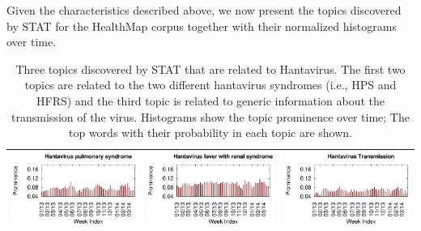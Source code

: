 \documentclass[conference]{IEEEtran}
\newcommand{\model}{{STAT}\xspace} %
\begin{document}
Given the characteristics described above, we now present the topics discovered by \model for the HealthMap corpus together with their normalized histograms over time.


\begin{table}[t]
\begin{center}
\caption{Three topics discovered by \model that are related to Hantavirus. The first two topics are related to the two different hantavirus syndromes (i.e., HPS and HFRS) and the third topic is related to generic information about the  transmission of the virus. Histograms show the topic prominence over time; The top words with their probability in each topic are shown.}
\large{
\begin{tabular}{|lr|lr|lr|}
\hline
\multicolumn{2}{|c|}{\includegraphics[clip,scale=0.45]{fig/topic_hanta_timeline.eps}} & \multicolumn{2}{|c|}{\includegraphics[clip,scale=0.45]{fig/topic_hanta3_timeline.eps}}& 
\multicolumn{2}{|c|}{\includegraphics[clip,scale=0.45]{fig/topic_hanta2_timeline.eps}} \\ \hline

\end{tabular}}
\end{center}
\end{table}
\end{document}
